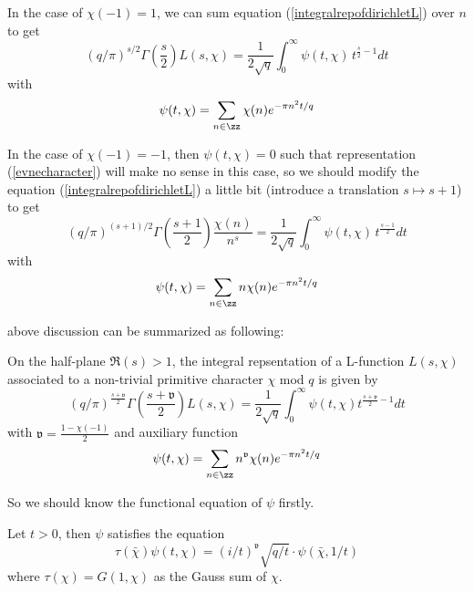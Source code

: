 In the case of \(\chi(-1) = 1\), we can sum equation (\ref{integralrepofdirichletL}) over \(n\) to get 
\begin{equation} \label{evnecharacter}
(q/\pi)^{s/2}\Gamma(\frac{s}{2})L(s,\chi) = \frac{1}{2\sqrt{q}}\int_{0}^{\infty} \psi(t,\chi) \, t^{\frac{s}{2}-1} dt
\end{equation}
with 
\[\psi(t,\chi) =  \sum_{n \in \zz}\chi(n)e^{-\pi n^2 t/q}\]

In the case of \(\chi(-1) = -1\), then \(\psi(t,\chi) = 0\) such that representation (\ref{evnecharacter}) will make no sense in this case, so we should modify the equation (\ref{integralrepofdirichletL}) a little bit (introduce a translation \(s \mapsto s+1\)) to get 
\begin{equation*}
    (q/\pi)^{(s+1)/2}\Gamma(\frac{s+1}{2})\frac{\chi(n)}{n^{s}} = \frac{1}{2\sqrt{q}}\int_{0}^{\infty} \psi(t,\chi) \, t^{\frac{s-1}{2}}dt
\end{equation*}
with
\[\psi(t,\chi) = \sum_{n \in \zz }n \chi(n) e^{-\pi n^2 t/q} \]

above discussion can be summarized as following:

\begin{lemma}
    On the half-plane \(\Re(s) > 1\), the integral repsentation of a  L-function \(L(s,\chi)\) associated to a non-trivial primitive character \(\chi\) mod \(q\) is given by
    \[(q/\pi)^{\frac{s+\mathfrak{v}}{2}}\Gamma(\frac{s+\mathfrak{v}}{2})L(s,\chi) = \frac{1}{2\sqrt{q}}\int_0^{\infty} \psi(t,\chi) t^{\frac{s+\mathfrak{v}}{2}-1} dt\]
    with \(\mathfrak{v} = \frac{1-\chi(-1)}{2}\) and auxiliary function 
    \[\psi(t,\chi) = \sum_{n \in \zz}n^{\mathfrak{v}}\chi(n)e^{-\pi n^2 t/q}\]


\end{lemma}

So we should know the functional equation of \(\psi\) firstly.

\begin{lemma}
    Let \(t>0\), then \(\psi\) satisfies the equation
    \[\tau(\bar{\chi})\psi(t,\chi) = (i/t)^{\mathfrak{v}}\sqrt{q/t} \cdot \psi(\bar{\chi},1/t)\]
    where \(\tau(\chi) = G(1,\chi)\) as the Gauss sum of \(\chi\).

\end{lemma}

